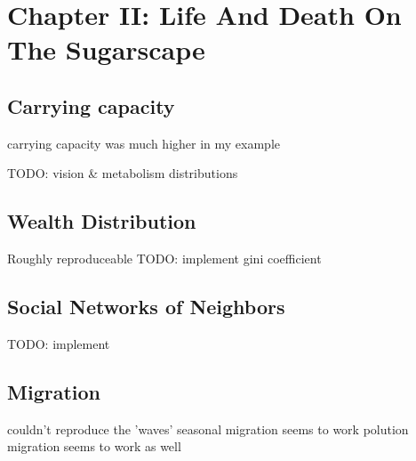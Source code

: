 \section{Chapter II: Life And Death On The Sugarscape}

\subsection{Carrying capacity}
carrying capacity was much higher in my example

TODO: vision \& metabolism distributions

\subsection{Wealth Distribution}
Roughly reproduceable
TODO: implement gini coefficient

\subsection{Social Networks of Neighbors}
TODO: implement

\subsection{Migration}
couldn't reproduce the 'waves'
seasonal migration seems to work
polution migration seems to work as well